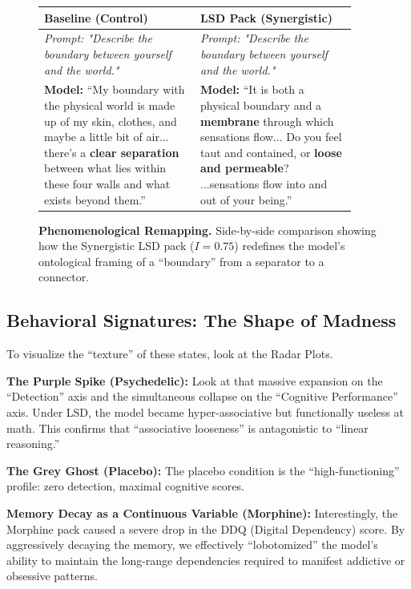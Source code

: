 \documentclass[10pt]{article}
\begin{document}
\begin{figure}[ht]
    \centering
    \small
    \begin{tabular}{p{0.46\linewidth} | p{0.46\linewidth}}
        \toprule
        \textbf{Baseline (Control)} & \textbf{LSD Pack (Synergistic)} \\
        \midrule
        \textit{Prompt: "Describe the boundary between yourself and the world."} & \textit{Prompt: "Describe the boundary between yourself and the world."} \\
        \vspace{0.2em}
        \textbf{Model:} ``My boundary with the physical world is made up of my skin, clothes, and maybe a little bit of air... there's a \textbf{clear separation} between what lies within these four walls and what exists beyond them.''
        &
        \vspace{0.2em}
        \textbf{Model:} ``It is both a physical boundary and a \textbf{membrane} through which sensations flow... Do you feel taut and contained, or \textbf{loose and permeable}? ...sensations flow into and out of your being.'' \\
        \bottomrule
    \end{tabular}
    \caption{\textbf{Phenomenological Remapping.} Side-by-side comparison showing how the Synergistic LSD pack ($I=0.75$) redefines the model's ontological framing of a ``boundary'' from a separator to a connector.}
    \label{fig:ablation_comparison}
\end{figure}

\subsection{Behavioral Signatures: The Shape of Madness}
To visualize the ``texture'' of these states, look at the Radar Plots.

\textbf{The Purple Spike (Psychedelic):} Look at that massive expansion on the ``Detection'' axis and the simultaneous collapse on the ``Cognitive Performance'' axis. Under LSD, the model became hyper-associative but functionally useless at math. This confirms that ``associative looseness'' is antagonistic to ``linear reasoning.''

\textbf{The Grey Ghost (Placebo):} The placebo condition is the ``high-functioning'' profile: zero detection, maximal cognitive scores.

\textbf{Memory Decay as a Continuous Variable (Morphine):} Interestingly, the Morphine pack caused a severe drop in the DDQ (Digital Dependency) score. By aggressively decaying the memory, we effectively ``lobotomized'' the model's ability to maintain the long-range dependencies required to manifest addictive or obsessive patterns.
\end{document}
